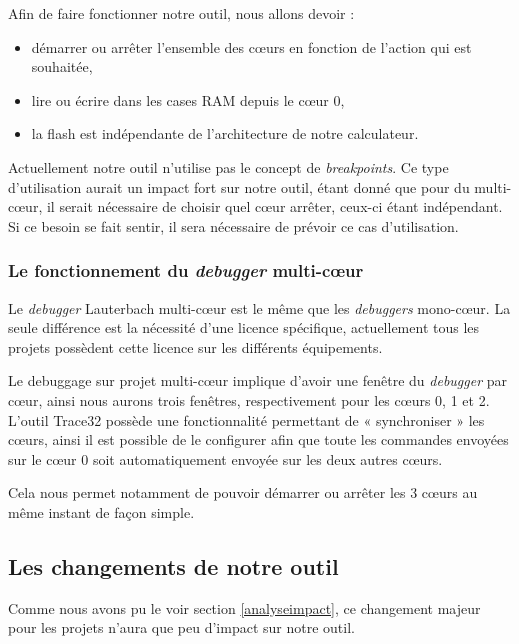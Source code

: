 Afin de faire fonctionner notre outil, nous allons devoir : 
\begin{itemize}
	\item démarrer ou arrêter l'ensemble des c\oe{}urs en fonction de l'action qui est souhaitée,
	\item lire ou écrire dans les cases RAM depuis le c\oe{}ur 0,
	\item la flash est indépendante de l'architecture de notre calculateur.\\
\end{itemize}

\begin{remarque}
Actuellement notre outil n'utilise pas le concept de \textit{breakpoints}. Ce type d'utilisation aurait un impact fort sur notre outil, étant donné que pour du multi-cœur, il serait nécessaire de choisir quel c\oe{}ur arrêter, ceux-ci étant indépendant. Si ce besoin se fait sentir, il sera nécessaire de prévoir ce cas d'utilisation.
\end{remarque}

\subsubsection{Le fonctionnement du \textit{debugger} multi-cœur}
Le \textit{debugger} Lauterbach multi-cœur est le même que les \textit{debuggers} mono-cœur. La seule différence est la nécessité d'une licence spécifique, actuellement tous les projets possèdent cette licence sur les différents équipements. 

Le debuggage sur projet multi-cœur implique d'avoir une fenêtre du \textit{debugger} par cœur, ainsi nous aurons trois fenêtres, respectivement pour les cœurs 0, 1 et 2. L'outil Trace32 possède une fonctionnalité permettant de « synchroniser » les cœurs, ainsi il est possible de le configurer afin que toute les commandes envoyées sur le cœur 0 soit automatiquement envoyée sur les deux autres cœurs. 

Cela nous permet notamment de pouvoir démarrer ou arrêter les 3 c\oe{}urs au même instant de façon simple. 

\subsection{Les changements de notre outil}
Comme nous avons pu le voir section \ref{analyseimpact}, ce changement majeur pour les projets n'aura que peu d'impact sur notre outil.

